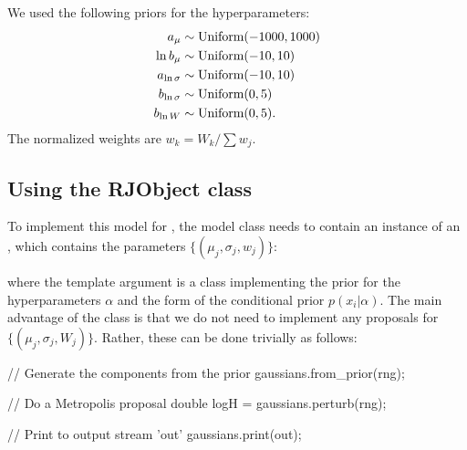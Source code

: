 \documentclass[article, nojss]{jss}
\begin{document}
We used the following priors for the hyperparameters:
\begin{align}
a_\mu &\sim \textnormal{Uniform}(-1000, 1000)\\
\ln b_\mu &\sim \textnormal{Uniform}(-10, 10)\\
a_{\ln\sigma} &\sim \textnormal{Uniform}(-10, 10)\\
b_{\ln\sigma} &\sim \textnormal{Uniform}(0, 5)\\
b_{\ln W} &\sim \textnormal{Uniform}(0, 5).
\end{align}
The normalized weights are $w_k = W_k/\sum w_j$.

\subsection{Using the RJObject class}
To implement this model for , the model
class needs to contain an instance of an
, which contains the parameters
$\{(\mu_j, \sigma_j, w_j)\}$:
\begin{CodeChunk}
\begin{CodeInput}
class MyModel
{
    private:
        DNest4::RJObject<MyConditionalPrior> gaussians;
....
\end{CodeInput}
\end{CodeChunk}
where the template argument 
is a class implementing the prior for the hyperparameters
$\alpha$ and the form of the conditional prior $p(x_i | \alpha)$.
The main advantage of the  class is that
we do not need to implement any proposals for $\{(\mu_j, \sigma_j, W_j)\}$.
Rather, these can be done trivially as follows:
\begin{CodeChunk}
\begin{CodeInput}
    // Generate the components from the prior
    gaussians.from_prior(rng);

    // Do a Metropolis proposal
    double logH = gaussians.perturb(rng);

    // Print to output stream 'out'
    gaussians.print(out);
\end{CodeInput}
\end{CodeChunk}
\end{document}
